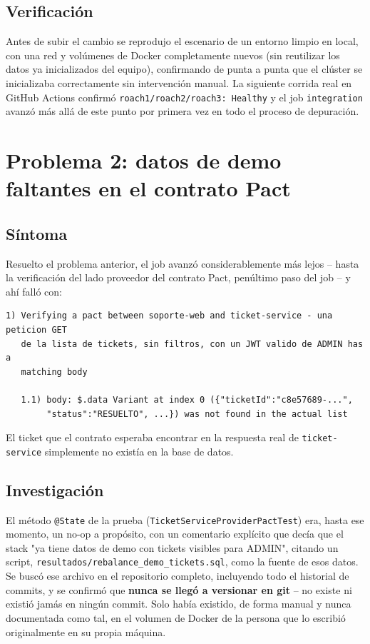 \documentclass[11pt,letterpaper]{article}
\begin{document}
\subsection{Verificación}
Antes de subir el cambio se reprodujo el escenario de un entorno limpio en local, con una red y
volúmenes de Docker completamente nuevos (sin reutilizar los datos ya inicializados del equipo),
confirmando de punta a punta que el clúster se inicializaba correctamente sin intervención
manual. La siguiente corrida real en GitHub Actions confirmó
\texttt{roach1/roach2/roach3: Healthy} y el job \texttt{integration} avanzó más allá de este
punto por primera vez en todo el proceso de depuración.

\section{Problema 2: datos de demo faltantes en el contrato Pact}

\subsection{Síntoma}
Resuelto el problema anterior, el job avanzó considerablemente más lejos -- hasta la
verificación del lado proveedor del contrato Pact, penúltimo paso del job -- y ahí falló con:

\begin{lstlisting}[caption={Fallo real de la verificacion del contrato}]
1) Verifying a pact between soporte-web and ticket-service - una peticion GET
   de la lista de tickets, sin filtros, con un JWT valido de ADMIN has a
   matching body

   1.1) body: $.data Variant at index 0 ({"ticketId":"c8e57689-...",
        "status":"RESUELTO", ...}) was not found in the actual list
\end{lstlisting}

El ticket que el contrato esperaba encontrar en la respuesta real de \texttt{ticket-service}
simplemente no existía en la base de datos.

\subsection{Investigación}
El método \texttt{@State} de la prueba (\texttt{TicketServiceProviderPactTest}) era, hasta ese
momento, un no-op a propósito, con un comentario explícito que decía que el stack "ya tiene datos
de demo con tickets visibles para ADMIN", citando un script,
\texttt{resultados/rebalance\_demo\_tickets.sql}, como la fuente de esos datos. Se buscó ese
archivo en el repositorio completo, incluyendo todo el historial de commits, y se confirmó que
\textbf{nunca se llegó a versionar en git} -- no existe ni existió jamás en ningún commit. Solo
había existido, de forma manual y nunca documentada como tal, en el volumen de Docker de la
persona que lo escribió originalmente en su propia máquina.
\end{document}
